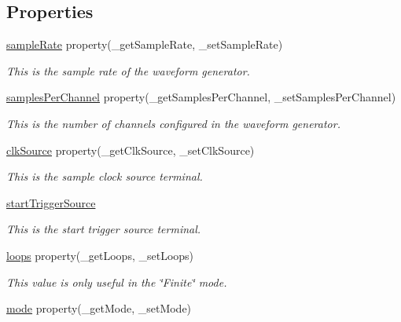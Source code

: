 \subsection*{Properties}
\begin{DoxyCompactItemize}
\item 
\hyperlink{class_chassis_8git_1_1_waveform_generator_1_1_waveform_generator_a4152a26948eb36959f5ee99440dfa911}{sample\-Rate} property(\-\_\-get\-Sample\-Rate, \-\_\-set\-Sample\-Rate)
\begin{DoxyCompactList}\small\item\em This is the sample rate of the waveform generator. \end{DoxyCompactList}\item 
\hyperlink{class_chassis_8git_1_1_waveform_generator_1_1_waveform_generator_aa02528250ab9e7fd9ab04c3244eb8299}{samples\-Per\-Channel} property(\-\_\-get\-Samples\-Per\-Channel, \-\_\-set\-Samples\-Per\-Channel)
\begin{DoxyCompactList}\small\item\em This is the number of channels configured in the waveform generator. \end{DoxyCompactList}\item 
\hyperlink{class_chassis_8git_1_1_waveform_generator_1_1_waveform_generator_a078c66a16dae8dc6bbf6c2ae55ff7c75}{clk\-Source} property(\-\_\-get\-Clk\-Source, \-\_\-set\-Clk\-Source)
\begin{DoxyCompactList}\small\item\em This is the sample clock source terminal. \end{DoxyCompactList}\item 
\hyperlink{class_chassis_8git_1_1_waveform_generator_1_1_waveform_generator_af18771d98f5d12ff87a18c94cc6e6035}{start\-Trigger\-Source}
\begin{DoxyCompactList}\small\item\em This is the start trigger source terminal. \end{DoxyCompactList}\item 
\hyperlink{class_chassis_8git_1_1_waveform_generator_1_1_waveform_generator_a1b91e7f61684217ac0067de9631b4603}{loops} property(\-\_\-get\-Loops, \-\_\-set\-Loops)
\begin{DoxyCompactList}\small\item\em This value is only useful in the \char`\"{}\-Finite\char`\"{} mode. \end{DoxyCompactList}\item 
\hyperlink{class_chassis_8git_1_1_waveform_generator_1_1_waveform_generator_a523b65929f8a3fa8af88d5c6a2e4297e}{mode} property(\-\_\-get\-Mode, \-\_\-set\-Mode)

\end{DoxyCompactItemize}
